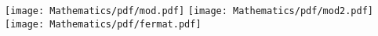 \texttt{[image: Mathematics/pdf/mod.pdf]}
\texttt{[image: Mathematics/pdf/mod2.pdf]}
\texttt{[image: Mathematics/pdf/fermat.pdf]}